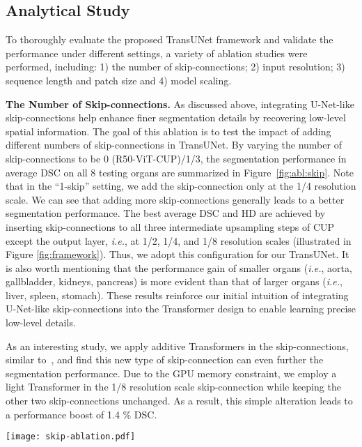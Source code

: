 \documentclass[runningheads]{llncs}
\begin{document}
\subsection{Analytical Study}
\label{sec:analytical}
To thoroughly evaluate the proposed TransUNet framework and validate the performance under different settings, a variety of ablation studies were performed, including: 1) the number of skip-connections; 2) input resolution; 3) sequence length and patch size and 4) model scaling.


\vspace{1ex}\noindent\textbf{The Number of Skip-connections.}
As discussed above, integrating U-Net-like skip-connections help enhance finer segmentation details by recovering low-level spatial information. The goal of this ablation is to test the impact of adding different numbers of skip-connections in TransUNet. 
By varying the number of skip-connections to be 0 (R50-ViT-CUP)/1/3, the segmentation performance in average DSC on all 8 testing organs are summarized in Figure~\ref{fig:abl:skip}.
Note that in the ``1-skip'' setting, we add the skip-connection only at the 1/4 resolution scale.
We can see that adding more skip-connections generally leads to a better segmentation performance. 
The best average DSC and HD are achieved by inserting skip-connections to all three intermediate upsampling steps of CUP except the output layer, \emph{i.e.}, at 1/2, 1/4, and 1/8 resolution scales (illustrated in Figure \ref{fig:framework}). 
Thus, we adopt this configuration for our TransUNet. 
It is also worth mentioning that the performance gain of smaller organs (\emph{i.e.}, aorta, gallbladder, kidneys, pancreas) is more evident than that of larger organs (\emph{i.e.}, liver, spleen, stomach).
These results reinforce our initial intuition of integrating U-Net-like skip-connections into the Transformer design to enable learning precise low-level details. 


As an interesting study, we apply additive Transformers in the skip-connections, similar to~\cite{schlemper2019attention}, and find this new type of skip-connection can even further the segmentation performance. 
Due to the GPU memory constraint, we employ a light Transformer in the 1/8 resolution scale skip-connection while keeping the other two skip-connections unchanged. As a result, this simple alteration leads to a performance boost of 1.4 \% DSC. 


\begin{figure*}
    \centering
    \texttt{[image: skip-ablation.pdf]}
    \caption{Ablation study on the number of skip-connections in TransUNet.}
    \label{fig:abl:skip}
\end{figure*}
\end{document}
